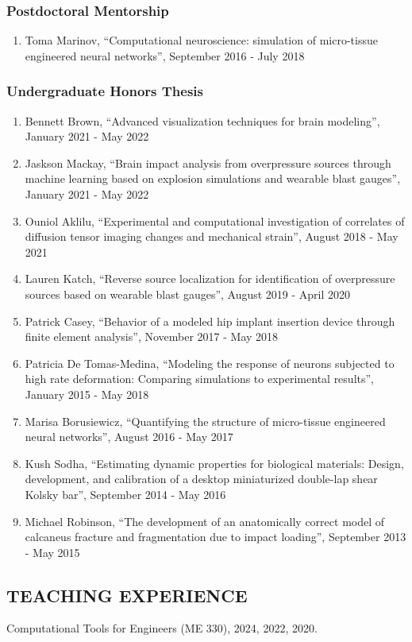 \documentclass[11pt]{article}
\begin{document}
\subsubsection{Postdoctoral Mentorship}
\begin{enumerate}
\def\labelenumi{\arabic{enumi}.}
\item Toma Marinov, ``Computational neuroscience: simulation of micro-tissue engineered neural networks'', September 2016 - July 2018
\end{enumerate}
\subsubsection{Undergraduate Honors
Thesis}
\begin{enumerate}
\def\labelenumi{\arabic{enumi}.}
\item Bennett Brown, ``Advanced visualization techniques for brain modeling'', January 2021 - May 2022
\item Jaskson Mackay, ``Brain impact analysis from overpressure sources through machine learning based on explosion simulations and wearable blast gauges'', January 2021 - May 2022
\item Ouniol Aklilu, ``Experimental and computational investigation of correlates of diffusion tensor imaging changes and mechanical strain'', August 2018 - May 2021
\item Lauren Katch, ``Reverse source localization for identification of overpressure sources based on wearable blast gauges'', August 2019 - April 2020
\item Patrick Casey, ``Behavior of a modeled hip implant insertion device through finite element analysis'', November 2017 - May 2018
\item Patricia De Tomas-Medina, ``Modeling the response of neurons subjected to high rate deformation: Comparing simulations to experimental results'', January 2015 - May 2018
\item Marisa Borusiewicz, ``Quantifying the structure of micro-tissue engineered neural networks'', August 2016 - May 2017
\item Kush Sodha, ``Estimating dynamic properties for biological materials: Design, development, and calibration of a desktop miniaturized double-lap shear Kolsky bar'', September 2014 - May 2016
\item Michael Robinson, ``The development of an anatomically correct model of calcaneus fracture and fragmentation due to impact loading'', September 2013 - May 2015
\end{enumerate}\subsection{TEACHING EXPERIENCE}\label{teaching-experience}
Computational Tools for Engineers (ME 330), 2024, 2022, 2020.
\end{document}
